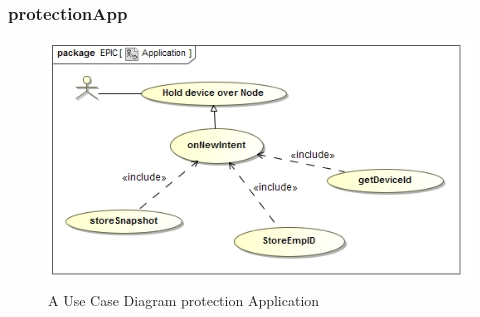\documentclass{article}
\begin{document}
		\subsubsection{protectionApp}
		\begin{figure}[H]
 			 \centering
			  \includegraphics[width=12cm]{ApplicationUseCase}
		 	 \caption{A Use Case Diagram protection Application}
		\end{figure}
\end{document}
